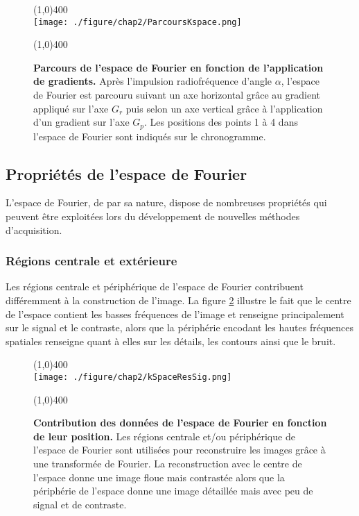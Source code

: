 \begin{figure}[H]
\centering
\line(1,0){400} \\
\texttt{[image: ./figure/chap2/ParcoursKspace.png]}
\caption[Parcours de l'espace de Fourier en fonction de l'application de gradients.]{\label{fig:ParcoursKspace} \textbf{Parcours de l'espace de Fourier en fonction de l'application de gradients.} Après l'impulsion radiofréquence d'angle $\alpha$, l'espace de Fourier est parcouru suivant un axe horizontal grâce au gradient appliqué sur l'axe $G_r$ puis selon un axe vertical grâce à l'application d'un gradient sur l'axe $G_p$. Les positions des points 1 à 4 dans l'espace de Fourier sont indiqués sur le chronogramme.}
\line(1,0){400} \\
\end{figure}


\subsection{Propriétés de l'espace de Fourier}

L'espace de Fourier, de par sa nature, dispose de nombreuses propriétés qui peuvent être exploitées lors du développement de nouvelles méthodes d'acquisition. 

\subsubsection{Régions centrale et extérieure}
\label{subsec:KSpaceRegion}
Les régions centrale et périphérique de l'espace de Fourier contribuent différemment à la construction de l'image. La figure \ref{fig:kSpaceResSig} illustre le fait que le centre de l'espace contient les basses fréquences de l'image et renseigne principalement sur le signal et le contraste, alors que la périphérie encodant les hautes fréquences spatiales renseigne quant à elles sur les détails, les contours ainsi que le bruit.

\begin{figure}[H]
\centering
\line(1,0){400} \\
\texttt{[image: ./figure/chap2/kSpaceResSig.png]}
\caption[Contribution des données de l'espace de Fourier en fonction de leur position.]{\label{fig:kSpaceResSig} \textbf{Contribution des données de l'espace de Fourier en fonction de leur position.} Les régions centrale et/ou périphérique de l'espace de Fourier sont utilisées pour reconstruire les images grâce à une transformée de Fourier. La reconstruction avec le centre de l'espace donne une image floue mais contrastée alors que la périphérie de l'espace donne une image détaillée mais avec peu de signal et de contraste.}
\line(1,0){400} \\
\end{figure}

